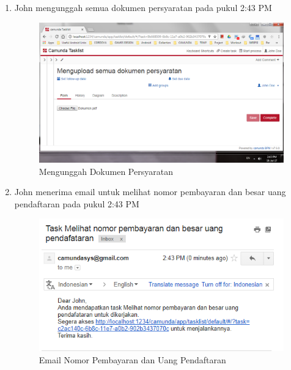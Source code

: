 \begin{enumerate}
	\item John mengunggah semua dokumen persyaratan pada pukul 2:43 PM
			\begin{figure}[H]
			\centering
			\includegraphics[scale=0.5]{Gambar/Bab-5/kasus2/5}
			\caption{Mengunggah Dokumen Persyaratan} 
			\label{fig:pengujian_kasus2_5}
	\end{figure}
	

	\item John menerima email untuk melihat nomor pembayaran dan besar uang pendaftaran pada pukul 2:43 PM
			\begin{figure}[H]
			\centering
			\includegraphics[scale=0.8]{Gambar/Bab-5/kasus2/6}
			\caption{Email Nomor Pembayaran dan Uang Pendaftaran} 
			\label{fig:pengujian_kasus2_6}
	\end{figure}
	


\end{enumerate}
